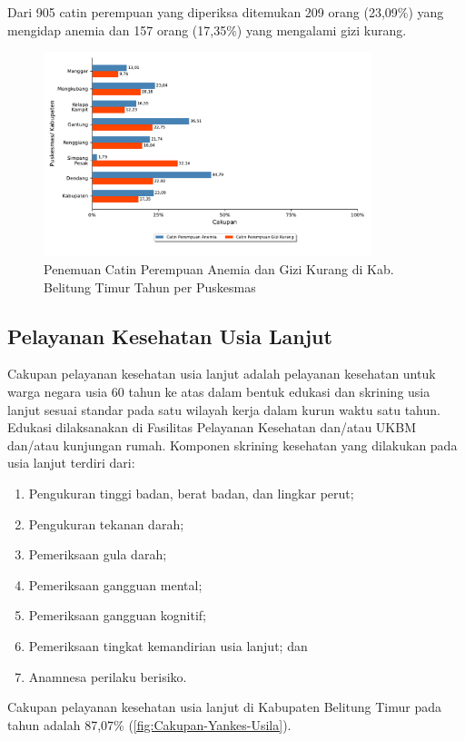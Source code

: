 Dari 905 catin perempuan yang diperiksa ditemukan 209 orang (23,09\%) yang mengidap anemia dan 157 orang (17,35\%) yang mengalami gizi kurang.

\begin{figure}[H]
	\centering
	\includegraphics[width=0.85\textwidth]{bab_05/bab_05_29b_catinResiko}
	\caption{Penemuan Catin Perempuan Anemia dan Gizi Kurang di Kab. Belitung Timur Tahun \tP per Puskesmas}
	\label{fig:Cakupan-Yankes-Catin-Anemia}
\end{figure}

\subsection{Pelayanan Kesehatan Usia Lanjut}
Cakupan pelayanan kesehatan usia lanjut adalah pelayanan kesehatan untuk warga negara usia 60 tahun ke atas dalam bentuk edukasi dan skrining usia
lanjut sesuai standar pada satu wilayah kerja dalam kurun waktu satu tahun. Edukasi dilaksanakan di Fasilitas Pelayanan Kesehatan dan/atau UKBM dan/atau kunjungan rumah. Komponen skrining kesehatan yang dilakukan pada usia lanjut terdiri dari:
\begin{enumerate}
  \item Pengukuran tinggi badan, berat badan, dan lingkar perut;
  \item Pengukuran tekanan darah;
  \item Pemeriksaan gula darah;
  \item Pemeriksaan gangguan mental;
  \item Pemeriksaan gangguan kognitif;
  \item Pemeriksaan tingkat kemandirian usia lanjut; dan
  \item Anamnesa perilaku berisiko.
\end{enumerate}

Cakupan pelayanan kesehatan usia lanjut di Kabupaten Belitung Timur pada tahun \tP adalah 87,07\% (\autoref{fig:Cakupan-Yankes-Usila}).

